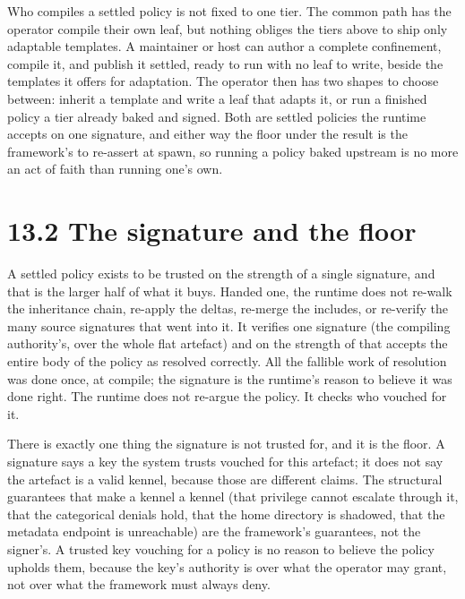 Who compiles a settled policy is not fixed to one tier. The common path
has the operator compile their own leaf, but nothing obliges the tiers
above to ship only adaptable templates. A maintainer or host can author
a complete confinement, compile it, and publish it settled, ready to run
with no leaf to write, beside the templates it offers for adaptation.
The operator then has two shapes to choose between: inherit a template
and write a leaf that adapts it, or run a finished policy a tier already
baked and signed. Both are settled policies the runtime accepts on one
signature, and either way the floor under the result is the framework's
to re-assert at spawn, so running a policy baked upstream is no more an
act of faith than running one's own.

\hypertarget{the-signature-and-the-floor}{%
\section{13.2 The signature and the
floor}\label{the-signature-and-the-floor}}

A settled policy exists to be trusted on the strength of a single
signature, and that is the larger half of what it buys. Handed one, the
runtime does not re-walk the inheritance chain, re-apply the deltas,
re-merge the includes, or re-verify the many source signatures that went
into it. It verifies one signature (the compiling authority's, over the
whole flat artefact) and on the strength of that accepts the entire body
of the policy as resolved correctly. All the fallible work of resolution
was done once, at compile; the signature is the runtime's reason to
believe it was done right. The runtime does not re-argue the policy. It
checks who vouched for it.

There is exactly one thing the signature is not trusted for, and it is
the floor. A signature says a key the system trusts vouched for this
artefact; it does not say the artefact is a valid kennel, because those
are different claims. The structural guarantees that make a kennel a
kennel (that privilege cannot escalate through it, that the categorical
denials hold, that the home directory is shadowed, that the metadata
endpoint is unreachable) are the framework's guarantees, not the
signer's. A trusted key vouching for a policy is no reason to believe
the policy upholds them, because the key's authority is over what the
operator may grant, not over what the framework must always deny.


